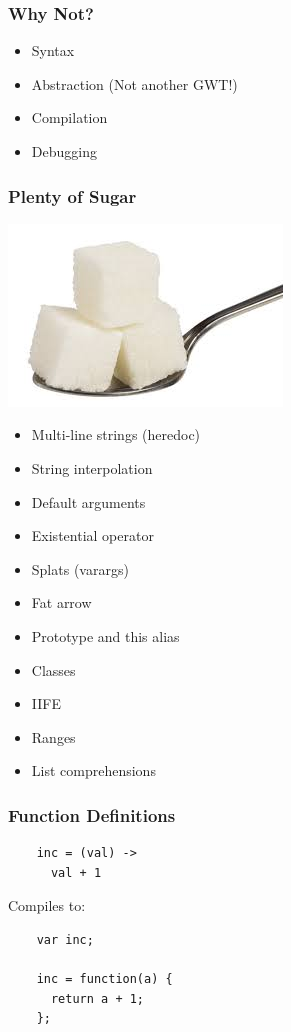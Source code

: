 \documentclass{beamer}
\begin{document}
\begin{frame}
  \frametitle{Why Not?}
  \begin{itemize}
    \pause
    \item Syntax
    \pause
    \item Abstraction (Not another GWT!)
    \pause
    \item Compilation
    \pause
    \item Debugging
      \pause
  \end{itemize}
\end{frame}



\begin{frame}
  \frametitle{Plenty of Sugar}
  \includegraphics[scale=.40]{sugar}
%
%
  \begin{multicols}{2}
  \begin{itemize}
    \item Multi-line strings (heredoc)
    \item String interpolation
    \item Default arguments
    \item Existential operator
    \item Splats (varargs)
    \item Fat arrow
    \item Prototype and this alias
    \item Classes
    \item IIFE
    \item Ranges
    \item List comprehensions
  \end{itemize}
  \end{multicols}
\end{frame}

\begin{frame}[fragile]
  \frametitle{Function Definitions}

  \begin{verbatim}
    inc = (val) ->
      val + 1
  \end{verbatim}

  \pause
  \vspace{.5cm}
  Compiles to:
  \vspace{.5cm}

  \begin{verbatim}
    var inc;

    inc = function(a) {
      return a + 1;
    };    
  \end{verbatim}  
\end{frame}
\end{document}
